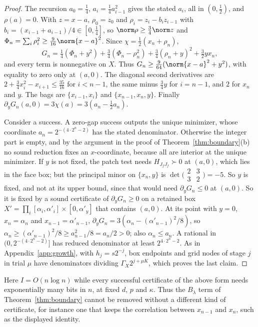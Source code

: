 \begin{proof}
The recursion $a_0=\frac14$, $a_i=\frac14a_{i-1}^2$ gives the stated $a_i$,
all in $(0,\frac12)$, and $\rho(a)=0$. With $z=x-a$, $\rho_0=z_0$ and
$\rho_i=z_i-b_iz_{i-1}$ with $b_i=(x_{i-1}+a_{i-1})/4\in[0,\frac14]$, so
$\norm\rho\ge\frac34\norm z$ and $\Phi_n=\sum_i\rho_i^2\ge\frac9{16}\norm{x-a}^2$.
Since $\chi=\frac12(x_n+\rho_n)$,
\[
G_n=\tfrac14(\Phi_n+y^2)+\tfrac34(\Phi_n-\rho_n^2)+\tfrac34(\rho_n+y)^2+\tfrac32yx_n ,
\]
and every term is nonnegative on $X$. Thus
$G_n\ge\frac9{64}(\norm{x-a}^2+y^2)$, with equality to zero only at $(a,0)$.
The diagonal second derivatives are $2+\frac34x_i^2-x_{i+1}\le\frac{35}{16}$
for $i<n-1$, the same minus $\frac34y$ for $i=n-1$, and $2$ for $x_n$ and
$y$. The bags are $\{x_{i-1},x_i\}$ and $\{x_{n-1},x_n,y\}$. Finally
$\partial_yG_n(a,0)=3\chi(a)=3(a_n-\frac12a_n)$.

Consider a success. A zero-gap success outputs the unique minimizer, whose
coordinate $a_n=2^{-(4\cdot2^n-2)}$ has the stated denominator. Otherwise
the integer part is empty, and by the argument in the proof of
Theorem~\ref{thm:boundary}(b) no sound reduction fixes an $x$-coordinate,
because all are interior at the unique minimizer. If $y$ is not fixed, the
patch test needs $H_{J_fJ_f}\succ0$ at $(a,0)$, which lies in the face box; but
the principal minor on $\{x_n,y\}$ is
$\det\bigl(\begin{smallmatrix}2&3\\3&2\end{smallmatrix}\bigr)=-5$. So $y$ is
fixed, and not at its upper bound, since that would need
$\partial_yG_n\le0$ at $(a,0)$. So it is fixed by a sound certificate of
$\partial_yG_n\ge0$ on a retained box
$X'=\prod_i[\alpha_i,\alpha'_i]\times[0,\alpha'_y]$ that contains $(a,0)$. At
its point with $y=0$, $x_n=\alpha_n$ and $x_{n-1}=\alpha'_{n-1}$,
$\partial_yG_n=3(\alpha_n-(\alpha'_{n-1})^2/8)$, so
$\alpha_n\ge(\alpha'_{n-1})^2/8\ge a_{n-1}^2/8=a_n/2>0$; also $\alpha_n\le a_n$.
A rational in $(0,2^{-(4\cdot2^n-2)}]$ has reduced denominator at least
$2^{4\cdot2^n-2}$. As in Appendix~\ref{app:growth}, with $h_j=s2^{-j}$, box
endpoints and grid nodes of stage $j$ in trial $\mu$ have denominators
dividing $\Gamma_X2^{j+\mu K}$, which proves the last claim.
\end{proof}

Here $I=O(n\log n)$ while every successful certificate of the above form
needs exponentially many bits in $n$, at fixed $d$, $p$ and $\kappa$. Thus
the $B_\lambda$ term of Theorem~\ref{thm:boundary} cannot be removed without
a different kind of certificate, for instance one that keeps the correlation
between $x_{n-1}$ and $x_n$, such as the displayed identity.

